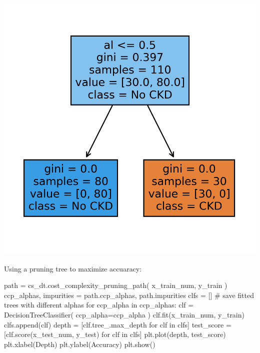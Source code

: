 \documentclass[
  11pt,
  letterpaper,
  DIV=11,
  numbers=noendperiod]{scrartcl}
\newenvironment{Shaded}{\begin{snugshade}}{\end{snugshade}}
\newcommand{\CommentTok}[1]{\textcolor[rgb]{0.37,0.37,0.37}{#1}}
\newcommand{\ControlFlowTok}[1]{\textcolor[rgb]{0.00,0.23,0.31}{#1}}
\newcommand{\KeywordTok}[1]{\textcolor[rgb]{0.00,0.23,0.31}{#1}}
\newcommand{\NormalTok}[1]{\textcolor[rgb]{0.00,0.23,0.31}{#1}}
\newcommand{\OperatorTok}[1]{\textcolor[rgb]{0.37,0.37,0.37}{#1}}
\newcommand{\StringTok}[1]{\textcolor[rgb]{0.13,0.47,0.30}{#1}}
\begin{document}
\includegraphics{Seebach_Lily_HW6_files/figure-pdf/cell-21-output-2.png}

Using a pruning tree to maximize accuaracy:

\begin{Shaded}
\begin{Highlighting}[]
\NormalTok{path }\OperatorTok{=}\NormalTok{ cs\_dt.cost\_complexity\_pruning\_path(}
\NormalTok{    x\_train\_num, }
\NormalTok{    y\_train}
\NormalTok{)}
\NormalTok{ccp\_alphas, impurities }\OperatorTok{=}\NormalTok{ path.ccp\_alphas, path.impurities}
\NormalTok{clfs }\OperatorTok{=}\NormalTok{ [] }\CommentTok{\# save fitted trees with different alphas}
\ControlFlowTok{for}\NormalTok{ ccp\_alpha }\KeywordTok{in}\NormalTok{ ccp\_alphas:}
\NormalTok{    clf }\OperatorTok{=}\NormalTok{ DecisionTreeClassifier(}
\NormalTok{        ccp\_alpha}\OperatorTok{=}\NormalTok{ccp\_alpha}
\NormalTok{        )}
\NormalTok{    clf.fit(x\_train\_num, y\_train)}
\NormalTok{    clfs.append(clf)}
\NormalTok{depth }\OperatorTok{=}\NormalTok{ [clf.tree\_.max\_depth }\ControlFlowTok{for}\NormalTok{ clf }\KeywordTok{in}\NormalTok{ clfs]}
\NormalTok{test\_score }\OperatorTok{=}\NormalTok{ [clf.score(x\_test\_num, y\_test) }\ControlFlowTok{for}\NormalTok{ clf }\KeywordTok{in}\NormalTok{ clfs]}
\NormalTok{plt.plot(depth, test\_score)}
\NormalTok{plt.xlabel(}\StringTok{\textquotesingle{}Depth\textquotesingle{}}\NormalTok{)}
\NormalTok{plt.ylabel(}\StringTok{\textquotesingle{}Accuracy\textquotesingle{}}\NormalTok{)}
\NormalTok{plt.show()}
\end{Highlighting}
\end{Shaded}
\end{document}
